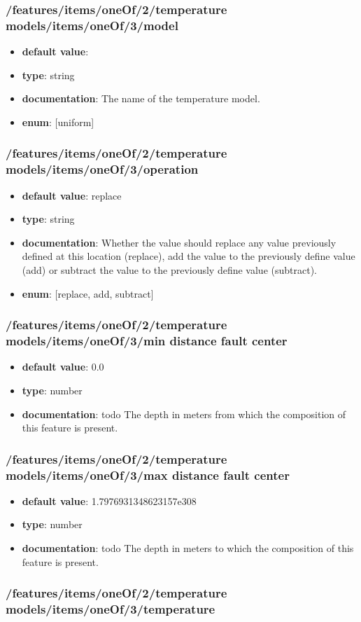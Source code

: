 \subsubsection{/features/items/oneOf/2/temperature models/items/oneOf/3/model}
\begin{itemize}\item {\bf default value}: 
\item {\bf type}: string
\item {\bf documentation}: The name of the temperature model.
\item {\bf enum}: [uniform]\end{itemize}\subsubsection{/features/items/oneOf/2/temperature models/items/oneOf/3/operation}
\begin{itemize}\item {\bf default value}: replace
\item {\bf type}: string
\item {\bf documentation}: Whether the value should replace any value previously defined at this location (replace), add the value to the previously define value (add) or subtract the value to the previously define value (subtract).
\item {\bf enum}: [replace, add, subtract]\end{itemize}\subsubsection{/features/items/oneOf/2/temperature models/items/oneOf/3/min distance fault center}
\begin{itemize}\item {\bf default value}: 0.0
\item {\bf type}: number
\item {\bf documentation}: todo The depth in meters from which the composition of this feature is present.
\end{itemize}\subsubsection{/features/items/oneOf/2/temperature models/items/oneOf/3/max distance fault center}
\begin{itemize}\item {\bf default value}: 1.7976931348623157e308
\item {\bf type}: number
\item {\bf documentation}: todo The depth in meters to which the composition of this feature is present.
\end{itemize}\subsubsection{/features/items/oneOf/2/temperature models/items/oneOf/3/temperature}
